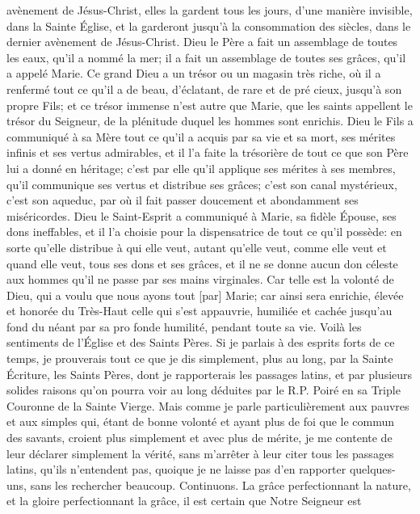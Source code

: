 avènement de Jésus-Christ, elles la gardent tous les jours, d'une manière invisible, dans la Sainte Église, et la
garderont jusqu'à la consommation des siècles, dans le dernier avènement de Jésus-Christ.
 Dieu le Père a fait un assemblage de toutes les eaux, qu'il a nommé la mer; il a fait un assemblage de toutes
ses grâces, qu'il a appelé Marie. Ce grand Dieu a un trésor ou un magasin très riche, où il a renfermé tout ce qu'il
a de beau, d'éclatant, de rare et de pré cieux, jusqu'à son propre Fils; et ce trésor immense n'est autre que Marie,
que les saints appellent le trésor du Seigneur, de la plénitude duquel les hommes sont enrichis.
 Dieu le Fils a communiqué à sa Mère tout ce qu'il a acquis par sa vie et sa mort, ses mérites infinis et ses
vertus admirables, et il l'a faite la trésorière de tout ce que son Père lui a donné en héritage; c'est par elle qu'il
applique ses mérites à ses membres, qu'il communique ses vertus et distribue ses grâces; c'est son canal
mystérieux, c'est son aqueduc, par où il fait passer doucement et abondamment ses miséricordes.
 Dieu le Saint-Esprit a communiqué à Marie, sa fidèle Épouse, ses dons ineffables, et il l'a choisie pour la
dispensatrice de tout ce qu'il possède: en sorte qu'elle distribue à qui elle veut, autant qu'elle veut, comme elle
veut et quand elle veut, tous ses dons et ses grâces, et il ne se donne aucun don céleste aux hommes qu'il ne
passe par ses mains virginales. Car telle est la volonté de Dieu, qui a voulu que nous ayons tout [par] Marie; car
ainsi sera enrichie, élevée et honorée du Très-Haut celle qui s'est appauvrie, humiliée et cachée jusqu'au fond du
néant par sa pro fonde humilité, pendant toute sa vie. Voilà les sentiments de l'Église et des Saints Pères.
 Si je parlais à des esprits forts de ce temps, je prouverais tout ce que je dis simplement, plus au long, par la
Sainte Écriture, les Saints Pères, dont je rapporterais les passages latins, et par plusieurs solides raisons qu'on
pourra voir au long déduites par le R.P. Poiré en sa Triple Couronne de la Sainte Vierge. Mais comme je parle
particulièrement aux pauvres et aux simples qui, étant de bonne volonté et ayant plus de foi que le commun des
savants, croient plus simplement et avec plus de mérite, je me contente de leur déclarer simplement la vérité, sans
m'arrêter à leur citer tous les passages latins, qu'ils n'entendent pas, quoique je ne laisse pas d'en rapporter
quelques-uns, sans les rechercher beaucoup. Continuons.
 La grâce perfectionnant la nature, et la gloire perfectionnant la grâce, il est certain que Notre Seigneur est

